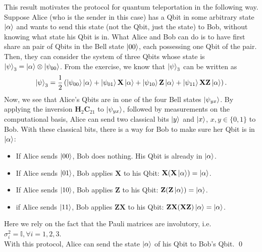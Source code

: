 \documentclass{book}
\theoremstyle{definition}
\newcommand{\al}{\alpha}
\newcommand{\X}{\mathbf{X}}
\newcommand{\f}[2]{\frac{#1}{#2}}
\newcommand{\lp}{\left(}
\newcommand{\rp}{\right)}
\newcommand{\Id}{\mathbb{I}}
\newcommand{\Z}{\mathbf{Z}}
\newcommand{\had}{\mathbf{H}}
\begin{document}
This result motivates the protocol for quantum teleportation in the following way. Suppose Alice (who is the sender in this case) has a Qbit in some arbitrary state $\ket{\al}$ and wants to send this state (not the Qbit, just the state) to Bob, without knowing what state his Qbit is in. What Alice and Bob can do is to have first share an pair of Qbits in the Bell state $\ket{00}$, each possessing one Qbit of the pair.  Then, they can consider the system of three Qbits whose state is $\ket{\psi}_3 = \ket{\al} \otimes \ket{\psi_{00}}$. From the exercise, we know that $\ket{\psi}_3$ can be written as
\begin{align}
\ket{\psi}_3 = \f{1}{2} \lp \ket{\psi_{00}}\ket{\al} + \ket{\psi_{01}}\X\ket{\al} + \ket{\psi_{10}}\Z\ket{\al} + \ket{\psi_{11}}\X \Z \ket{\al} \rp.
\end{align}
Now, we see that Alice's Qbits are in one of the four Bell states $\ket{\psi_{yx}}$. By applying the inversion $\had_2 \mathbf{C}_{21}$ to $\ket{\psi_{yx}}$, followed by measurements on the computational basis, Alice can send two classical bits $\ket{y}$ and $\ket{x}$, $x,y \in \{0,1\}$ to Bob. With these classical bits, there is a way for Bob to make sure her Qbit is in $\ket{\al}$:
\begin{itemize}
	\item If Alice sends $\ket{00}$,  Bob does nothing. His Qbit is already in $\ket{\al}$.
	\item If  Alice sends $\ket{01}$,  Bob applies $\X$ to his Qbit: $\X (\X \ket{\al}) = \ket{\al}$. 
	\item If Alice sends $\ket{10}$,  Bob applies $\Z$ to his Qbit: $\Z (\Z \ket{\al}) = \ket{\al}$.
	\item if Alice sends $\ket{11}$,  Bob applies $\Z\X$ to his Qbit: $\Z\X (\X\Z)\ket{\al} = \ket{\al}$.
\end{itemize}  
Here we rely on the fact that the Pauli matrices are involutory, i.e. $\sigma_i^2 = \Id, \forall i = 1,2,3$. \\

With this protocol, Alice can send the state $\ket{\al}$ of his Qbit to Bob's Qbit.  \qed
\end{document}
